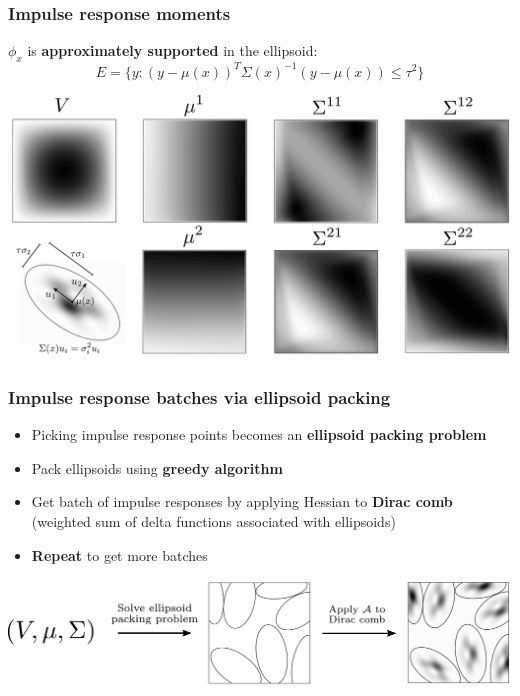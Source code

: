 \documentclass[10pt,final,xcolor=dvipsnames]{beamer}
\begin{document}
\begin{frame}
	\frametitle{Impulse response moments}
	$\phi_x$ is \textbf{approximately supported} in the ellipsoid:
	$$E = \{y: (y - \mu(x))^T\Sigma(x)^{-1}(y - \mu(x)) \le \tau^2\}$$
	\begin{center}
		\includegraphics[scale=0.28]{frog_moments4.pdf}
	\end{center}
\end{frame}
\begin{frame}
	\frametitle{Impulse response batches via ellipsoid packing}
	\begin{itemize}	
		\setlength{\itemsep}{1em}
		\item Picking impulse response points becomes an \textbf{ellipsoid packing problem}
		\item Pack ellipsoids using \textbf{greedy algorithm}
		\item Get batch of impulse responses by applying Hessian to \textbf{Dirac comb} (weighted sum of delta functions associated with ellipsoids)
		\item \textbf{Repeat} to get more batches
	\end{itemize}
	\vspace{2em}
  	\includegraphics[width=0.9\columnwidth]{frog_batches3.pdf}  
\end{frame}
\end{document}
